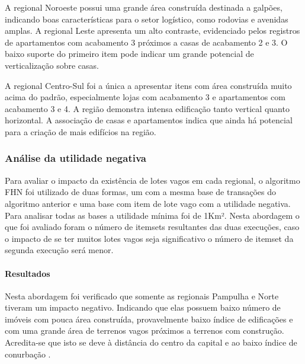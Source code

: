 \documentclass[12pt]{article}
\begin{document}
A regional Noroeste possui uma grande área construída destinada a galpões, indicando boas características para o setor logístico, como rodovias e avenidas amplas. A regional Leste apresenta um alto contraste, evidenciado pelos registros de apartamentos com acabamento 3 próximos a casas de acabamento 2 e 3. O baixo suporte do primeiro item pode indicar um grande potencial de verticalização sobre casas.

A regional Centro-Sul foi a única a apresentar itens com área construída muito acima do padrão, especialmente lojas com acabamento 3 e apartamentos com acabamento 3 e 4. A região demonstra intensa edificação tanto vertical quanto horizontal. A associação de casas e apartamentos indica que ainda há potencial para a criação de mais edifícios na região.

 \subsubsection{Análise da utilidade negativa}
Para avaliar o impacto da existência de lotes vagos em cada regional, o algoritmo FHN \cite{fournier2014fhn} foi utilizado de duas formas, um com a mesma base de transações do algoritmo anterior e uma base com item de lote vago com a utilidade negativa. Para analisar todas as bases a utilidade mínima foi de 1Km².
Nesta abordagem o que foi avaliado foram o número de itemsets resultantes das duas execuções, caso o impacto de se ter muitos lotes vagos seja significativo o número de itemset da segunda execução será menor.

\paragraph{Resultados}
Nesta abordagem foi verificado que somente as regionais Pampulha e Norte tiveram um impacto negativo. Indicando que elas possuem baixo número de imóveis com pouca área construída, provavelmente baixo índice de edificações e com uma grande área de terrenos vagos próximos a terrenos com construção. Acredita-se que isto se deve à distância do centro da capital e ao baixo índice de conurbação \cite{wiki:cornubacao}.
\end{document}
